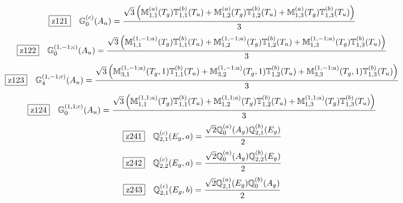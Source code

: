 \documentclass[fleqn,10pt,landscape]{jsarticle}
\begin{document}
\begin{dmath*}
\hspace*{3mm}\fbox{z121}\quad \mathbb{G}_{0}^{(c)}(A_{u})=\frac{\sqrt{3} \left(\mathbb{M}_{1,1}^{(a)}(T_{g}) \mathbb{T}_{1,1}^{(b)}(T_{u}) + \mathbb{M}_{1,2}^{(a)}(T_{g}) \mathbb{T}_{1,2}^{(b)}(T_{u}) + \mathbb{M}_{1,3}^{(a)}(T_{g}) \mathbb{T}_{1,3}^{(b)}(T_{u})\right)}{3}
\end{dmath*}
\begin{dmath*}
\hspace*{3mm}\fbox{z122}\quad \mathbb{G}_{0}^{(1,-1;c)}(A_{u})=\frac{\sqrt{3} \left(\mathbb{M}_{1,1}^{(1,-1;a)}(T_{g}) \mathbb{T}_{1,1}^{(b)}(T_{u}) + \mathbb{M}_{1,2}^{(1,-1;a)}(T_{g}) \mathbb{T}_{1,2}^{(b)}(T_{u}) + \mathbb{M}_{1,3}^{(1,-1;a)}(T_{g}) \mathbb{T}_{1,3}^{(b)}(T_{u})\right)}{3}
\end{dmath*}
\begin{dmath*}
\hspace*{3mm}\fbox{z123}\quad \mathbb{G}_{4}^{(1,-1;c)}(A_{u})=\frac{\sqrt{3} \left(\mathbb{M}_{3,1}^{(1,-1;a)}(T_{g},1) \mathbb{T}_{1,1}^{(b)}(T_{u}) + \mathbb{M}_{3,2}^{(1,-1;a)}(T_{g},1) \mathbb{T}_{1,2}^{(b)}(T_{u}) + \mathbb{M}_{3,3}^{(1,-1;a)}(T_{g},1) \mathbb{T}_{1,3}^{(b)}(T_{u})\right)}{3}
\end{dmath*}
\begin{dmath*}
\hspace*{3mm}\fbox{z124}\quad \mathbb{G}_{0}^{(1,1;c)}(A_{u})=\frac{\sqrt{3} \left(\mathbb{M}_{1,1}^{(1,1;a)}(T_{g}) \mathbb{T}_{1,1}^{(b)}(T_{u}) + \mathbb{M}_{1,2}^{(1,1;a)}(T_{g}) \mathbb{T}_{1,2}^{(b)}(T_{u}) + \mathbb{M}_{1,3}^{(1,1;a)}(T_{g}) \mathbb{T}_{1,3}^{(b)}(T_{u})\right)}{3}
\end{dmath*}
\begin{dmath*}
\hspace*{3mm}\fbox{z241}\quad \mathbb{Q}_{2,1}^{(c)}(E_{g},a)=\frac{\sqrt{2} \mathbb{Q}_{0}^{(a)}(A_{g}) \mathbb{Q}_{2,1}^{(b)}(E_{g})}{2}
\end{dmath*}
\begin{dmath*}
\hspace*{3mm}\fbox{z242}\quad \mathbb{Q}_{2,2}^{(c)}(E_{g},a)=\frac{\sqrt{2} \mathbb{Q}_{0}^{(a)}(A_{g}) \mathbb{Q}_{2,2}^{(b)}(E_{g})}{2}
\end{dmath*}
\begin{dmath*}
\hspace*{3mm}\fbox{z243}\quad \mathbb{Q}_{2,1}^{(c)}(E_{g},b)=\frac{\sqrt{2} \mathbb{Q}_{2,1}^{(a)}(E_{g}) \mathbb{Q}_{0}^{(b)}(A_{g})}{2}
\end{dmath*}
\end{document}
